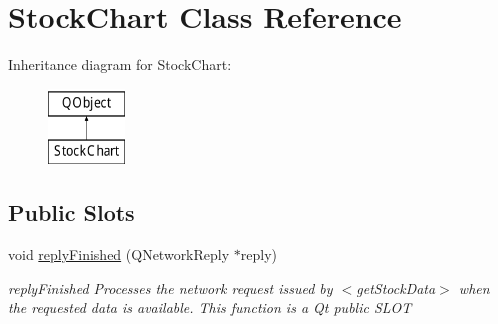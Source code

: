 \hypertarget{class_stock_chart}{}\section{Stock\+Chart Class Reference}
\label{class_stock_chart}
Inheritance diagram for Stock\+Chart\+:\begin{figure}[H]
\begin{center}
\leavevmode
\includegraphics[height=2.000000cm]{class_stock_chart}
\end{center}
\end{figure}
\subsection*{Public Slots}
\begin{DoxyCompactItemize}
\item 
void \hyperlink{class_stock_chart_a2521c5991cca0803f5890e23d90672da}{reply\+Finished} (Q\+Network\+Reply $\ast$reply)
\begin{DoxyCompactList}\small\item\em reply\+Finished Processes the network request issued by $<$get\+Stock\+Data$>$ when the requested data is available. This function is a Qt public S\+L\+OT \end{DoxyCompactList}\end{DoxyCompactItemize}
